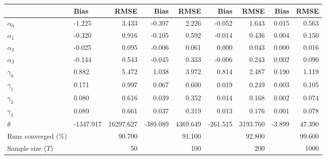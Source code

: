 
\begin{tabular}[t]{llrrrrrrr}
\toprule
  & Bias & RMSE & Bias & RMSE & Bias & RMSE & Bias & RMSE\\
\midrule
$\alpha_{0}$ & -1.225 & 3.433 & -0.397 & 2.226 & -0.052 & 1.643 & 0.015 & 0.563\\
$\alpha_{1}$ & -0.320 & 0.916 & -0.105 & 0.592 & -0.014 & 0.436 & 0.004 & 0.150\\
$\alpha_{2}$ & -0.025 & 0.095 & -0.006 & 0.061 & 0.000 & 0.043 & 0.000 & 0.016\\
$\alpha_{3}$ & -0.144 & 0.543 & -0.045 & 0.333 & -0.006 & 0.243 & 0.002 & 0.090\\
$\gamma_{0}$ & 0.882 & 5.472 & 1.038 & 3.972 & 0.814 & 2.487 & 0.190 & 1.119\\
$\gamma_{1}$ & 0.171 & 0.997 & 0.067 & 0.600 & 0.019 & 0.249 & 0.003 & 0.105\\
$\gamma_{2}$ & 0.080 & 0.616 & 0.039 & 0.352 & 0.014 & 0.168 & 0.002 & 0.074\\
$\gamma_{3}$ & 0.089 & 0.661 & 0.037 & 0.319 & 0.013 & 0.176 & 0.001 & 0.078\\
$\theta$ & -1347.917 & 16297.627 & -389.089 & 4369.649 & -261.515 & 3193.760 & -3.899 & 47.390\\
Runs converged (\%) &  & 90.700 &  & 91.100 &  & 92.800 &  & 99.600\\
Sample size ($T$) &  & 50 &  & 100 &  & 200 &  & 1000\\
\bottomrule
\end{tabular}
